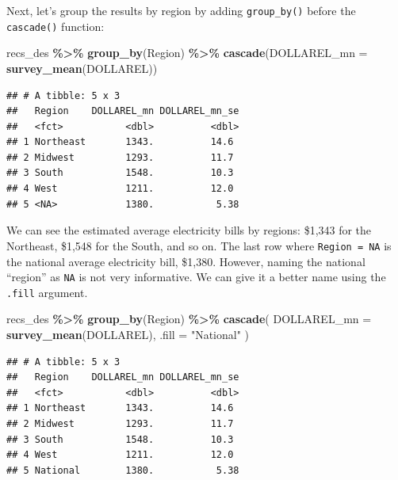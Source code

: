 \documentclass[
]{krantz}
\makeatletter
\newenvironment{Shaded}{\begin{snugshade}}{\end{snugshade}}
\newcommand{\AttributeTok}[1]{\textcolor[rgb]{0.27,0.27,0.27}{#1}}
\newcommand{\FunctionTok}[1]{\textcolor[rgb]{0.27,0.27,0.27}{\textbf{#1}}}
\newcommand{\NormalTok}[1]{#1}
\newcommand{\SpecialCharTok}[1]{\textcolor[rgb]{0.43,0.43,0.43}{\textbf{#1}}}
\newcommand{\StringTok}[1]{\textcolor[rgb]{0.5,0.5,0.5}{#1}}
\newenvironment{kframe}{%
\medskip{}
\setlength{\fboxsep}{.8em}
 \def\at@end@of@kframe{}%
 \ifinner\ifhmode%
  \def\at@end@of@kframe{\end{minipage}}%
  \begin{minipage}{\columnwidth}%
 \fi\fi%
 \def\FrameCommand##1{\hskip\@totalleftmargin \hskip-\fboxsep
 \colorbox{shadecolor}{##1}\hskip-\fboxsep
     \hskip-\linewidth \hskip-\@totalleftmargin \hskip\columnwidth}%
 \MakeFramed {\advance\hsize-\width
   \@totalleftmargin\z@ \linewidth\hsize
   \@setminipage}}%
 {\par\unskip\endMakeFramed%
 \at@end@of@kframe}
\renewenvironment{Shaded}{\begin{kframe}}{\end{kframe}}
\makeatother
\begin{document}
Next, let's group the results by region by adding \texttt{group\_by()} before the \texttt{cascade()} function:

\begin{Shaded}
\begin{Highlighting}[]
\NormalTok{recs\_des }\SpecialCharTok{\%\textgreater{}\%}
  \FunctionTok{group\_by}\NormalTok{(Region) }\SpecialCharTok{\%\textgreater{}\%}
  \FunctionTok{cascade}\NormalTok{(}\AttributeTok{DOLLAREL\_mn =} \FunctionTok{survey\_mean}\NormalTok{(DOLLAREL))}
\end{Highlighting}
\end{Shaded}

\begin{verbatim}
## # A tibble: 5 x 3
##   Region    DOLLAREL_mn DOLLAREL_mn_se
##   <fct>           <dbl>          <dbl>
## 1 Northeast       1343.          14.6 
## 2 Midwest         1293.          11.7 
## 3 South           1548.          10.3 
## 4 West            1211.          12.0 
## 5 <NA>            1380.           5.38
\end{verbatim}

We can see the estimated average electricity bills by regions: \$1,343 for the Northeast, \$1,548 for the South, and so on. The last row where \texttt{Region\ =\ NA} is the national average electricity bill, \$1,380. However, naming the national ``region'' as \texttt{NA} is not very informative. We can give it a better name using the \texttt{.fill} argument.

\begin{Shaded}
\begin{Highlighting}[]
\NormalTok{recs\_des }\SpecialCharTok{\%\textgreater{}\%}
  \FunctionTok{group\_by}\NormalTok{(Region) }\SpecialCharTok{\%\textgreater{}\%}
  \FunctionTok{cascade}\NormalTok{(}
    \AttributeTok{DOLLAREL\_mn =} \FunctionTok{survey\_mean}\NormalTok{(DOLLAREL),}
    \AttributeTok{.fill =} \StringTok{"National"}
\NormalTok{  )}
\end{Highlighting}
\end{Shaded}

\begin{verbatim}
## # A tibble: 5 x 3
##   Region    DOLLAREL_mn DOLLAREL_mn_se
##   <fct>           <dbl>          <dbl>
## 1 Northeast       1343.          14.6 
## 2 Midwest         1293.          11.7 
## 3 South           1548.          10.3 
## 4 West            1211.          12.0 
## 5 National        1380.           5.38
\end{verbatim}
\end{document}
